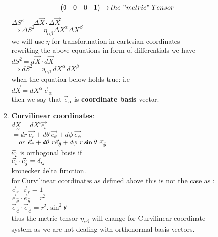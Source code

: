\documentclass[11pt,a4paper]{article}
\begin{document}
\begin{enumerate}
\begin{enumerate}
\begin{enumerate}
\[\begin{pmatrix}
                                      0  & 0 & 0 & 1 \\\end{pmatrix} \rightarrow the\ "metric"\ Tensor \]
                              $\Delta{S^2} = \Delta \vec{X} \cdot \Delta\vec{X}$\\
                              $\Rightarrow \Delta{S^2} = {\displaystyle{\eta_{\alpha\beta}}} \Delta X^{\alpha} \Delta X^{\beta}$\\
                              we will use $\eta$ for transformation in cartesian coordinates\\
                              rewriting the above equations in form of differentials we have\\
                              $d{S^2} = d \vec{X} \cdot d\vec{X}$\\
                              $\Rightarrow d {S^2} = {\displaystyle{\eta_{\alpha\beta}}}\ d X^{\alpha}\ d X^{\beta}$\\

                              when the equation below holds true: i.e\\
                              $d\vec{X}= dX^{\alpha}\ \vec{e}_{\alpha}$\\
                              then we say that $\vec{e}_{\alpha}$ is \textbf{coordinate basis} vector.
                        \item \textbf{Curvilinear coordinates}:\\
                              $d\underset{\sim}{X} = dX^i \vec{e_i}$\\
                              $= d{r}\ \vec{e_r} + d\theta\ \vec{e_{\theta}} +d\phi\ \vec{e_{\phi}} $\\
                              $= d{r}\ \vec{e}_{\hat{r}} + d\theta\ r \vec{e}_{\hat{\theta}} +d\phi\ r \sin\theta\ \vec{e}_{\Hat{\phi}} $\\

                              $\vec{e}_{\Hat{i}}$ is orthogonal basis if \\
                              $\vec{e}_{\Hat{i}}\cdot \vec{e}_{\Hat{j}} = \delta_{ij}$\\
                              kronecker delta function.\\
                              for Curvilinear coordinates as defined above this is not the case as :\\
                              $\vec{e}_{\hat{r}} \cdot \vec{e}_{\hat{r}} = 1 $\\
                              $\vec{e}_{\hat{\theta}} \cdot \vec{e}_{\hat{\theta}} = r^2 $\\
                              $\vec{e}_{\hat{\phi}} \cdot \vec{e}_{\hat{\phi}} = r^2.\sin^2\theta $\\
                              thus the metric tensor ${\displaystyle{\eta_{\alpha\beta}}}$ will change for Curvilinear coordinate system as we are not dealing with orthonormal basis vectors.


\end{enumerate}
\end{enumerate}
\end{enumerate}
\end{document}
